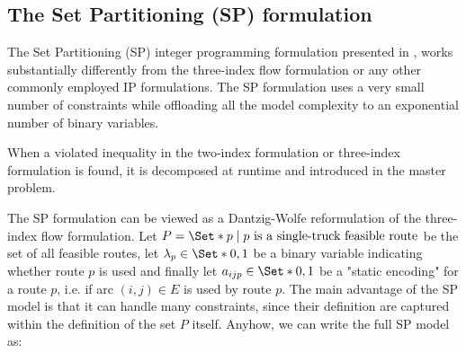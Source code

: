 \begin{comment}
\cite{jepsen2011}
Although the main focus of this thesis is exact solution methods, it is impor-
tant to remember that in real life the computational time needed to find the
optimal solution is not always available therefore it is important that the
exact solution algorithms can find good solutions within reasonable time.
Danna and Le Pape [18] have shown how to integrate the Branch-and-Price
algorithm with a local search framework. This integration helps the bcp
algorithm with finding good integer solutions in the early stages of the al-
gorithm. The method has show to result in reasonable good solutions for
the vrptw. Prescott-Gagnon et al. [55] have improved the heuristic ap-
proach for bcp algorithms further by integrating the bcp algorithm with
large neighbourhood search. For bac algorithms methods such as local
branching introduced by Fischetti and Lodi [28] and the feasibility pump
introduced by Fischetti et al. [29] can be used to find fast and good solu-
tions. The main benefit of the exact solution approach is that it provides
both an upper and lower bound.
Though when a fast good solution is needed a heuristics such as the
adaptive large scale neighbourhood search by Pisinger and Ropke [54] for
cvrp, vrptw and many other Vehicle Routing variants or the local search
heuristic by Zachariadis and Kiranoudis [65] are preferable.
\end{comment}

\subsection{The Set Partitioning (SP) formulation}
\label{sec:intro-set-partition-formulation}

The Set Partitioning (SP) integer programming formulation presented in \textcite{balinski1964},
works substantially differently from the three-index flow formulation or any other commonly employed IP formulations.
The SP formulation uses a very small number of constraints while offloading all the model complexity to an exponential number of binary variables.

When a violated inequality in the two-index formulation or three-index formulation is found, it is decomposed at runtime and introduced in the master problem.

The SP formulation can be viewed as a Dantzig-Wolfe reformulation \parencite{dantzig1960} of the three-index flow formulation.
Let $P = \Set*{p \mid p\ \text{is a single-truck feasible route}}$ be the set of all feasible routes,
let $\lambda_p \in \Set*{0, 1}$ be a binary variable indicating whether route $p$ is used
and finally let $a_{ijp} \in \Set*{0, 1}$ be a "static encoding" for a route $p$, i.e. if arc $(i, j) \in E$ is used by route $p$.
The main advantage of the SP model is that it can handle many constraints, since their definition are captured within the definition of the set $P$ itself.
Anyhow, we can write the full SP model as:


